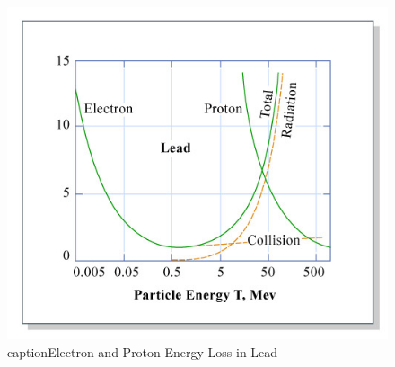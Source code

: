 \documentclass{school-22.101-notes}
\begin{document}
\begin{figure}[ht]
  \centering
  \includegraphics[width=5in]{images/ni/lead-ep.png}
  caption{Electron and Proton Energy Loss in Lead}
\end{figure}


\end{document}
